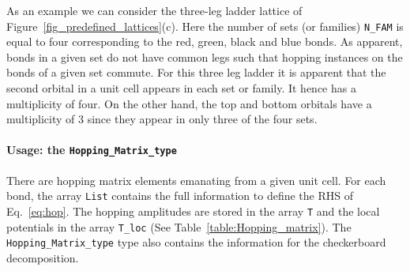 As an  example we can consider the three-leg ladder lattice of Figure~\ref{fig_predefined_lattices}(c).   Here the number of sets (or families) \texttt{N\_FAM}  is equal to four  corresponding to the red, green, black and blue  bonds.  As apparent,  bonds in a given set do not have common legs such that hopping instances on the bonds of a given set commute.     For this three leg ladder  it is apparent that the  second orbital in a unit cell appears  in each set or family. It hence has a multiplicity of four. On the other hand, the top and bottom orbitals have a multiplicity of 3 since they appear in only three of the four sets. 


\paragraph*{Usage: the \texttt{Hopping\_Matrix\_type} } %

There are     hopping   matrix  elements  emanating  from  a  given unit  cell. For  each bond,  the array 
\texttt{List}   contains the full  information to define the  RHS of Eq.~\eqref{eq:hop}.    The hopping amplitudes are  stored in the  array  \texttt{T}  and the local potentials in the  array \texttt{T\_loc}   (See  Table~\ref{table:Hopping_matrix}).    The  \texttt{Hopping\_Matrix\_type}   type    also contains the information for the  checkerboard   decomposition.

